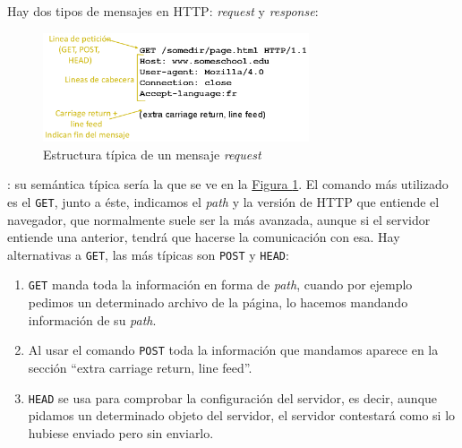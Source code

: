 \documentclass[10pt,a4paper,spanish]{report}
\begin{document}
Hay dos tipos de mensajes en HTTP: \textit{\textcolor{tema2}{request}} y \textit{\textcolor{tema2}{response}}:
\begin{description}
  \begin{figure}[!h]
    \centering
    \includegraphics[width=0.7\textwidth]{tema2_5}
    \caption{Estructura típica de un mensaje \textit{request}}
    \label{estrreq}
  \end{figure}
  \item[Request]: su semántica típica sería la que se ve en la \hyperref[estrreq]{Figura \ref*{estrreq}}. El comando más utilizado es el \texttt{GET}, junto a éste, indicamos el \textit{\textcolor{tema2}{path}} y la versión de HTTP que entiende el navegador, que normalmente suele ser la más avanzada, aunque si el servidor entiende una anterior, tendrá que hacerse la comunicación con esa. Hay alternativas a \texttt{GET}, las más típicas son \texttt{POST} y \texttt{HEAD}:
  \begin{enumerate}[\color{tema2}{$\bigstar$}]
    \item \texttt{GET} manda toda la información en forma de \textit{\textcolor{tema2}{path}}, cuando por ejemplo pedimos un determinado archivo de la página, lo hacemos mandando información de su \textcolor{tema2}{\textit{path}}.
    \item Al usar el comando \texttt{POST} toda la información que mandamos aparece en la sección ``extra carriage return, line feed''.
    \item \texttt{HEAD} se usa para comprobar la configuración del servidor, es decir, aunque pidamos un determinado objeto del servidor, el servidor contestará como si lo hubiese enviado pero sin enviarlo.
  \end{enumerate}


\end{description}
\end{document}
